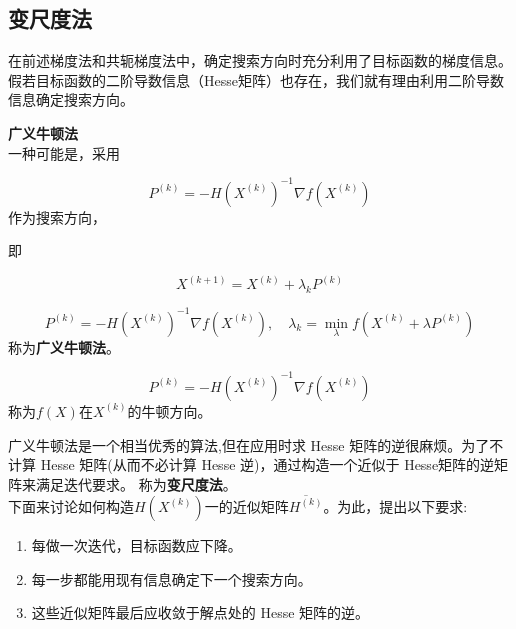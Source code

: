 \subsection{变尺度法}
在前述梯度法和共轭梯度法中，确定搜索方向时充分利用了目标函数的梯度信息。假若目标函数的二阶导数信息（Hesse矩阵）也存在，我们就有理由利用二阶导数信息确定搜索方向。
\begin{notebox}{\textbf{广义牛顿法}}{}
    \\

    一种可能是，采用
    
    \[
    P^{(k)} = -H(X^{(k)})^{-1} \nabla f(X^{(k)}) 
    \]
    作为搜索方向，
    
    即
    
    \[
    X^{(k+1)} = X^{(k)} + \lambda_k P^{(k)}
    \]
    
    \[
    P^{(k)} = -H(X^{(k)})^{-1} \nabla f(X^{(k)}), \quad \lambda_k = \min_\lambda f(X^{(k)} + \lambda P^{(k)})
    \]
    称为\textbf{广义牛顿法}。
    
    \[
    P^{(k)} = -H(X^{(k)})^{-1} \nabla f(X^{(k)}) 
    \]
    称为$f(X)$在$X^{(k)}$的牛顿方向。
\end{notebox}
广义牛顿法是一个相当优秀的算法,但在应用时求 Hesse 矩阵的逆很麻烦。为了不计算 Hesse 矩阵(从而不必计算 Hesse 逆)，通过构造一个近似于 Hesse矩阵的逆矩阵来满足迭代要求。
称为\textbf{变尺度法}。
\\下面来讨论如何构造$H(X^{(k)})$一的近似矩阵$\overline{H^{(k)}}$。为此，提出以下要求:
\begin{enumerate}
    \item 每做一次迭代，目标函数应下降。
    \item 每一步都能用现有信息确定下一个搜索方向。
    \item 这些近似矩阵最后应收敛于解点处的 Hesse 矩阵的逆。
\end{enumerate}

